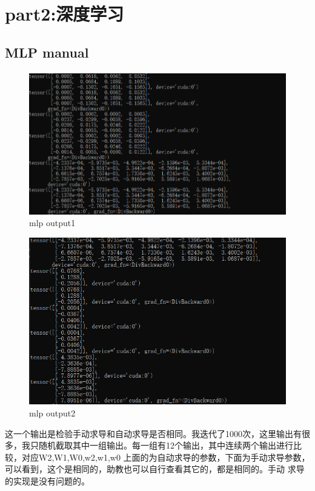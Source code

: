 \documentclass{report}
\begin{document}
    \section{part2:深度学习}
    \subsection{MLP manual}
    \begin{figure}[H]
        \centering
        \includegraphics[width=15cm]{MLP1.png}
        \caption{mlp output1}
    \end{figure}
    \begin{figure}[H]
        \centering
        \includegraphics[width=15cm]{MLP2.png}
        \caption{mlp output2}
    \end{figure}
    这一个输出是检验手动求导和自动求导是否相同。我迭代了1000次，这里输出有很多，我只随机截取其中一组输出。每一组有12个输出，其中连续两个输出进行比较，对应W2,W1,W0,w2,w1,w0
    上面的为自动求导的参数，下面为手动求导参数，可以看到，这个是相同的，助教也可以自行查看其它的，都是相同的。手动 求导的实现是没有问题的。\par 
\end{document}
